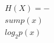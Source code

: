 \documentclass[preview]{standalone}
\begin{document}
\begin{align*}
H(X) = -\\sum p(x) \\log_2 p(x)
\end{align*}
\end{document}
